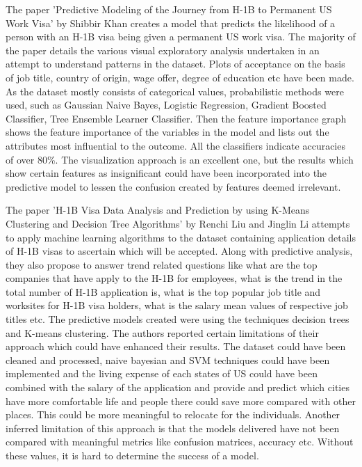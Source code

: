 \documentclass[conference]{IEEEtran}
\begin{document}
The paper 'Predictive Modeling of the Journey from H-1B to Permanent US Work Visa' by Shibbir Khan creates a model that predicts the likelihood of a person with an H-1B visa being given a permanent US work visa. The majority of the paper details the various visual exploratory analysis undertaken in an attempt to understand patterns in the dataset. Plots of acceptance on the basis of job title, country of origin, wage offer, degree of education etc have been made. As the dataset mostly consists of categorical values, probabilistic methods were used, such as Gaussian Naive Bayes, Logistic Regression, Gradient Boosted Classifier, Tree Ensemble Learner Classifier. Then the feature importance graph shows the feature importance of the variables in the model and lists out the attributes most influential to the outcome. All the classifiers indicate accuracies of over 80\%. The visualization approach is an excellent one, but the results which show certain features as insignificant could have been incorporated into the predictive model to lessen the confusion created by features deemed irrelevant.


The paper 'H-1B Visa Data Analysis and Prediction by using K-Means Clustering and Decision Tree Algorithms' by Renchi Liu and Jinglin Li attempts to apply machine learning algorithms to the dataset containing application details of H-1B visas to ascertain which will be accepted. Along with predictive analysis, they also propose to answer trend related questions like what are the top companies that have apply to the H-1B for employees, what is the trend in the total number of H-1B application is, what is the top popular job title and worksites for H-1B visa holders, what is the salary mean values of respective job titles etc. The predictive models created were using the techniques decision trees and K-means clustering. The authors reported certain limitations of their approach which could have enhanced their results. The dataset could have been cleaned and processed, naive bayesian and SVM techniques could have been implemented and the living expense of each states of US could have been combined with the salary of the application and provide and predict which cities have more comfortable life and people there could save more compared with other places. This could be more meaningful to relocate for the individuals. Another inferred limitation of this approach is that the models delivered have not been compared with meaningful metrics like confusion matrices, accuracy etc. Without these values, it is hard to determine the success of a model.
\end{document}
